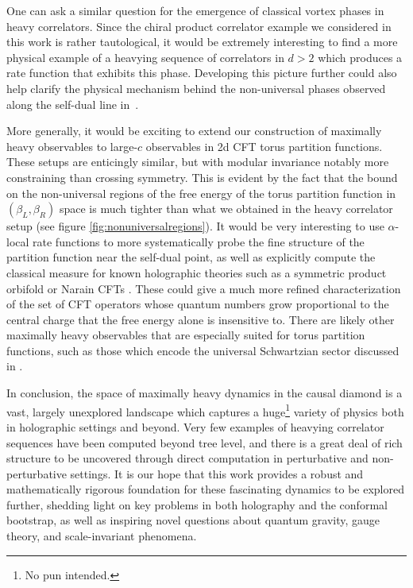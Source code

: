 \documentclass[a4paper,11pt]{article}
\theoremstyle{plain}
\theoremstyle{definition}
\theoremstyle{remark}
\begin{document}
One can ask a similar question for the emergence of classical vortex phases in heavy correlators. Since the chiral product correlator example we considered in this work is rather tautological, it would be extremely interesting to find a more physical example of a heavying sequence of correlators in $d>2$ which produces a rate function that exhibits this phase. Developing this picture further could also help clarify the physical mechanism behind the non-universal phases observed along the self-dual line in~\cite{Dey:2024nje}.

More generally, it would be exciting to extend our construction of maximally heavy observables to large-$c$ observables in 2d CFT torus partition functions. These setups are enticingly similar, but with modular invariance notably more constraining than crossing symmetry. This is evident by the fact that the bound on the non-universal regions of the free energy of the torus partition function in $(\beta_L,\beta_R)$ space is much tighter than what we obtained in the heavy correlator setup (see figure \ref{fig:nonuniversalregions}). It would be very interesting to use $\alpha$-local rate functions to more systematically probe the fine structure of the partition function near the self-dual point, as well as explicitly compute the classical measure for known holographic theories such as a symmetric product orbifold or Narain CFTs \cite{Dijkgraaf:1996xw,AfkhamiJeddi:2020hde, Benjamin:2021wzr,Maloney:2020nni}. These could give a much more refined characterization of the set of CFT operators whose quantum numbers grow proportional to the central charge that the free energy alone is insensitive to. There are likely other maximally heavy observables that are especially suited for torus partition functions, such as those which encode the universal Schwartzian sector discussed in \cite{Ghosh:2019rcj}.

In conclusion, the space of maximally heavy dynamics in the causal diamond is a vast, largely unexplored landscape which captures a huge\footnote{No pun intended.} variety of physics both in holographic settings and beyond. Very few examples of heavying correlator sequences have been computed beyond tree level, and there is a great deal of rich structure to be uncovered through direct computation in perturbative and non-perturbative settings. It is our hope that this work provides a robust and mathematically rigorous foundation for these fascinating dynamics to be explored further, shedding light on key problems in both holography and the conformal bootstrap, as well as inspiring novel questions about quantum gravity, gauge theory, and scale-invariant phenomena.
\end{document}
